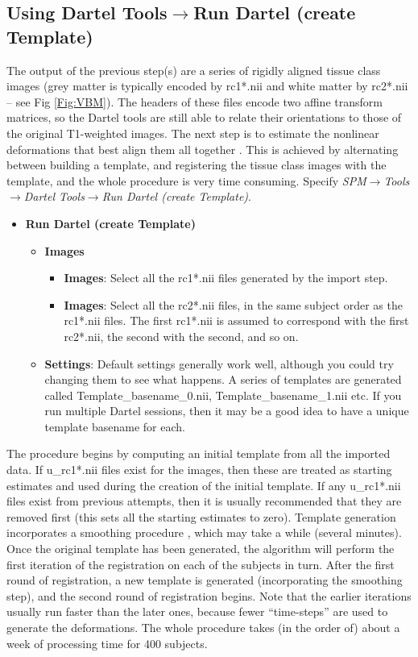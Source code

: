 \subsection{Using Dartel Tools$\rightarrow$Run Dartel (create Template)}
The output of the previous step(s) are a series of rigidly aligned tissue class images (grey matter is typically encoded by rc1*.nii and white matter by rc2*.nii -- see Fig \ref{Fig:VBM}).
The headers of these files encode two affine transform matrices, so the Dartel tools are still able to relate their orientations to those of the original T1-weighted images.
The next step is to estimate the nonlinear deformations that best align them all together \cite{ashburner07}.
This is achieved by alternating between building a template, and registering the tissue class images with the template, and the whole procedure is very time consuming.
Specify \emph{SPM$\rightarrow$Tools$\rightarrow$Dartel Tools$\rightarrow$Run Dartel (create Template)}.
\begin{itemize}
\item{{\bf Run Dartel (create Template)}
  \begin{itemize}
  \item{{\bf Images}
    \begin{itemize}
    \item{{\bf Images}: Select all the rc1*.nii files generated by the import step.
    }
    \item{{\bf Images}: Select all the rc2*.nii files, in the same subject order as the rc1*.nii files. The first rc1*.nii is assumed to correspond with the first rc2*.nii, the second with the second, and so on.
    }
    \end{itemize}
  }
  \item{{\bf Settings}: Default settings generally work well, although you could try changing them to see what happens. A series of templates are generated called Template\_basename\_0.nii, Template\_basename\_1.nii etc.  If you run multiple Dartel sessions, then it may be a good idea to have a unique template basename for each. 
  }
  \end{itemize}
}
\end{itemize}
The procedure begins by computing an initial template from all the imported data.
If u\_rc1*.nii files exist for the images, then these are treated as starting estimates and used during the creation of the initial template.  If any u\_rc1*.nii files exist from previous attempts, then it is usually recommended that they are removed first (this sets all the starting estimates to zero).
Template generation incorporates a smoothing procedure \cite{john_averageshape}, which may take a while (several minutes).
Once the original template has been generated, the algorithm will perform the first iteration of the registration on each of the subjects in turn.
After the first round of registration, a new template is generated (incorporating the smoothing step), and the second round of registration begins.
Note that the earlier iterations usually run faster than the later ones, because fewer ``time-steps'' are used to generate the deformations.
The whole procedure takes (in the order of) about a week of processing time for 400 subjects.

